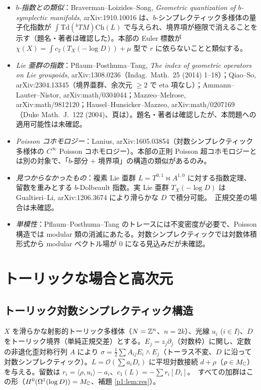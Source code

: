 \begin{rem}[\tC\ 文献の状況と障害]
\begin{itemize}
\item \emph{$b$-指数との類似}：Braverman--Loizides--Song, \emph{Geometric quantization of $b$-symplectic manifolds}, arXiv:1910.10016 は、$b$-シンプレクティック多様体の量子化指数が $\int\mathrm{Td}({}^bTM)\mathrm{Ch}(L)$ で与えられ、境界項が極限で消えることを示す（題名・著者は確認した\tC）。本部の Euler 標数が $\chi(X)=\int c_2(T_X(-\log D))+\mu$ 型で $r$ に依らないことと類似する。
\item \emph{Lie 亜群の指数}：Pflaum--Posthuma--Tang, \emph{The index of geometric operators on Lie groupoids}, arXiv:1308.0236（Indag.\ Math.\ 25 (2014) 1--18）；Qiao--So, arXiv:2304.13345（境界亜群、余次元 $\ge2$ で eta 項なし）；Ammann--Lauter--Nistor, arXiv:math/0304044；Mazzeo--Melrose, arXiv:math/9812120；Hausel--Hunsicker--Mazzeo, arXiv:math/0207169（Duke Math.\ J.\ 122 (2004)、頁は\tQ）。題名・著者は確認したが、本問題への適用可能性は未確認。
\item \emph{Poisson コホモロジー}：Lanius, arXiv:1605.03854（対数シンプレクティック多様体の $C^\infty$ Poisson コホモロジー）。本部の正則 Poisson 超コホモロジーとは別の対象で、「$b$-部分 $+$ 境界項」の構造の類似があるのみ。
\item \emph{見つからなかったもの}：複素 Lie 亜群 $L=T^{0,1}\bowtie A^{1,0}$ に対する指数定理、留数を重みとする $b$-Dolbeault 指数。実 Lie 亜群 $T_X(-\log D)$ は Gualtieri--Li, arXiv:1206.3674 により滑らかな $D$ で積分可能。\tC\ 正規交差の場合は未確認。
\item \emph{単模性}：Pflaum--Posthuma--Tang のトレースには不変密度が必要で、Poisson 構造では modular 類の消滅にあたる。対数シンプレクティックでは対数体積形式から modular ベクトル場が 0 になる見込みだが未確認\tQ。
\end{itemize}
\end{rem}

\section{トーリックな場合と高次元}\label{p1:sec:toric}
\subsection{トーリック対数シンプレクティック構造}
$X$ を滑らかな射影的トーリック多様体（$N=\mathbb Z^n$、$n=2k$）、光線 $u_i$ ($i\in I$)、$D$ をトーリック境界（単純正規交差）とする。$E_j=z_j\partial_j$（対数枠）に関し、定数の非退化歪対称行列 $A$ により $\sigma=\tfrac12\sum A_{ij}E_i\wedge E_j$（トーラス不変、$D$ に沿って対数シンプレクティック）。$L=\mathcal O(\sum a_iD_i)$ に平坦対数接続 $d+\rho$（$\rho\in M_\mathbb C$）を与える。留数は $r_i=\langle\rho,u_i\rangle-a_i$、$c_1(L)=-\sum r_i[D_i]$。\tP\ すべての加群はこの形（$H^0(\Omega^1(\log D))=M_\mathbb C$、補題 \ref{p1:lem:res}）。

